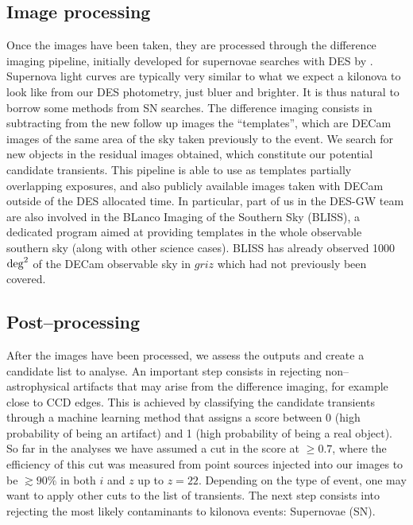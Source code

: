 \subsection{Image processing}
Once the images have been taken, they are processed through the difference imaging pipeline, initially developed for supernovae searches with DES by \citet{herner}. Supernova light curves are typically very similar to what we expect a kilonova to look like from our DES photometry, just bluer and brighter. It is thus natural to borrow some methods from SN searches. The difference imaging consists in subtracting from the new follow up images the ``templates'', which are DECam images of the same area of the sky taken previously to the event. We search for new objects in the residual images obtained, which constitute our potential candidate transients. This pipeline is able to use as templates partially overlapping exposures, and also publicly available images taken with DECam outside of the DES allocated time. In particular, part of us in the DES-GW team are also involved in the BLanco Imaging of the Southern Sky (BLISS), a dedicated program aimed at providing templates in the whole observable southern sky (along with other science cases). BLISS has already observed 1000 ${\rm deg}^2$ of the DECam observable sky in $griz$ which had not previously been covered.

\subsection{Post--processing}

After the images have been processed, we assess the outputs and create a candidate list to analyse. An important step consists in rejecting non--astrophysical artifacts that may arise from the difference imaging, for example close to CCD edges. This is achieved by classifying the candidate transients through a machine learning method that assigns a score between 0 (high probability of being an artifact) and 1 (high probability of being a real object). So far in the analyses we have assumed a cut in the score at $\geq 0.7$, where the efficiency of this cut was measured from point sources injected into our images to be $\gtrsim90\%$ in both $i$ and $z$ up to $z=22$. Depending on the type of event, one may want to apply other cuts to the list of transients. The next step consists into rejecting the most likely contaminants to kilonova events: Supernovae (SN). 

